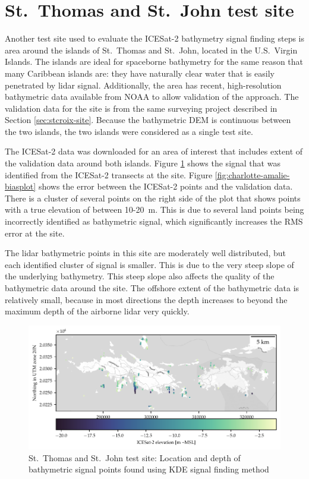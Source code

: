 \section{St.~Thomas and St.~John test site}
Another test site used to evaluate the ICESat-2 bathymetry signal finding steps is area around the islands of St.~Thomas and St.~John, located in the U.S.~Virgin Islands. The islands are ideal for spaceborne bathymetry for the same reason that many Caribbean islands are: they have naturally clear water that is easily penetrated by lidar signal. Additionally, the area has recent, high-resolution bathymetric data available from NOAA to allow validation of the approach. The validation data for the site is from the same surveying project described in Section \ref{sec:stcroix-site}. Because the bathymetric DEM is continuous between the two islands, the two islands were considered as a single test site.

The ICESat-2 data was downloaded for an area of interest that includes extent of the validation data around both islands. Figure \ref{fig:charlotte-amalie-photons} shows the signal that was identified from the ICESat-2 transects at the site. Figure \ref{fig:charlotte-amalie-biasplot} shows the error between the ICESat-2 points and the validation data. There is a cluster of several points on the right side of the plot that shows points with a true elevation of between 10-20~m. This is due to several land points being incorrectly identified as bathymetric signal, which significantly increases the RMS error at the site.

The lidar bathymetric points in this site are moderately well distributed, but each identified cluster of signal is smaller. This is due to the very steep slope of the underlying bathymetry. This steep slope also affects the quality of the bathymetric data around the site. The offshore extent of the bathymetric data is relatively small, because in most directions the depth increases to beyond the maximum depth of the airborne lidar very quickly.

\begin{figure}[!htb]
    \centering
    \includegraphics{figures/charlotteamalie_photon_map.pdf}
    \caption{St.~Thomas and St.~John test site: Location and depth of bathymetric signal points found using KDE signal finding method}
    \label{fig:charlotte-amalie-photons}
\end{figure}

